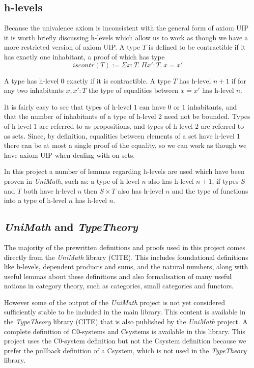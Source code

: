 \subsection{h-levels}
Because the univalence axiom is inconsistent with the general form of axiom UIP
it is worth briefly discussing h-levels which allow us to work as though we have
a more restricted version of axiom UIP. A type $T$ is defined to be contractible
if it has exactly one inhabitant, a proof of which has type
\[iscontr(T) := \Sigma x:T.\ \Pi x':T.\ x=x'\]

A type has h-level $0$ exactly if it is contractible. A type $T$ has h-level
$n+1$ if for any two inhabitants $x, x': T$ the type of equalities between
$x=x'$ has h-level $n$.

It is fairly easy to see that types of h-level $1$ can have $0$ or $1$
inhabitants, and that the number of inhabitants of a type of h-level $2$ need
not be bounded. Types of h-level $1$ are referred to as propositions, and types
of h-level $2$ are referred to as sets. Since, by definition, equalities between
elements of a set have h-level $1$ there can be at most a single proof of the
equality, so we can work as though we have axiom UIP when dealing with on sets.

In this project a number of lemmas regarding h-levels are used which have been
proven in \textit{UniMath}, such as: a type of h-level $n$ also has h-level
$n+1$, if types $S$ and $T$ both have h-level $n$ then $S\times T$ also has
h-level $n$ and the type of functions into a type of h-level $n$ has h-level
$n$.

\subsection{\textit{UniMath} and \textit{TypeTheory}}
The majority of the prewritten definitions and proofs used in this project comes
directly from the \textit{UniMath} library (CITE). This includes foundational
definitions like h-levels, dependent products and sums, and the natural numbers,
along with useful lemmas about these definitions and also formalisation of many
useful notions in category theory, such as categories, small categories and
functors.

However some of the output of the \textit{UniMath} project is not yet considered
sufficiently stable to be included in the main library. This content is
available in the \textit{TypeTheory} library (CITE) that is also published by
the \textit{UniMath} project. A complete definition of C0-systems and Csystems
is available in this library. This project uses the C0-system definition but not
the Csystem definition because we prefer the pullback definition of a Csystem,
which is not used in the \textit{TypeTheory} library.